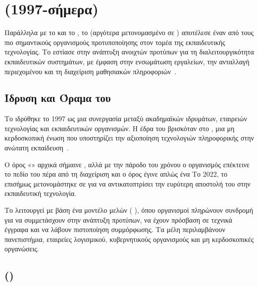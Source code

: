\section{    (1997-σήμερα)}
\label{sec:ims_global}

Παράλληλα με το  και το , το \textit{   } (αργότερα μετονομασμένο σε \textit{ }) αποτέλεσε έναν από τους πιο σημαντικούς οργανισμούς προτυποποίησης στον τομέα της εκπαιδευτικής τεχνολογίας. Το  εστίασε στην ανάπτυξη ανοιχτών προτύπων για τη διαλειτουργικότητα εκπαιδευτικών συστημάτων, με έμφαση στην ενσωμάτωση εργαλείων, την ανταλλαγή περιεχομένου και τη διαχείριση μαθησιακών πληροφοριών~\cite{ims2019lti,wiki_lti}.

\subsection{Ίδρυση και Όραμα του }
\label{subsec:ims_foundation}

Το     ιδρύθηκε το 1997 ως μια συνεργασία μεταξύ ακαδημαϊκών ιδρυμάτων, εταιρειών τεχνολογίας και εκπαιδευτικών οργανισμών. Η έδρα του βρισκόταν στο , μια μη κερδοσκοπική ένωση που υποστηρίζει την αξιοποίηση τεχνολογιών πληροφορικής στην ανώτατη εκπαίδευση~\cite{oneedtech2024lti}.

Ο όρος «» αρχικά σήμαινε \textit{  }, αλλά με την πάροδο του χρόνου ο οργανισμός επέκτεινε το πεδίο του πέρα από τη διαχείριση και ο όρος έγινε απλώς ένα   Το 2022, το   επισήμως μετονομάστηκε σε   για να αντικατοπτρίσει την ευρύτερη αποστολή του στην εκπαιδευτική τεχνολογία.

Το  λειτουργεί με βάση ένα μοντέλο μελών (\textit{ }), όπου οργανισμοί πληρώνουν συνδρομή για να συμμετάσχουν στην ανάπτυξη προτύπων, να έχουν πρόσβαση σε τεχνικά έγγραφα και να λάβουν πιστοποίηση συμμόρφωσης. Τα μέλη περιλαμβάνουν πανεπιστήμια, εταιρείες λογισμικού, κυβερνητικούς οργανισμούς και μη κερδοσκοπικές οργανώσεις.

\subsection{   ()}
\label{subsec:lti}

